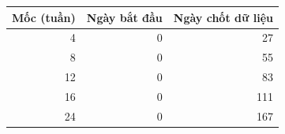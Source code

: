 \begin{tabular}{@{}rrr@{}}
\toprule
\textbf{Mốc (tuần)} & \textbf{Ngày bắt đầu} & \textbf{Ngày chốt dữ liệu} \\
\midrule
\num{4} & \num{0} & \num{27} \\
\num{8} & \num{0} & \num{55} \\
\num{12} & \num{0} & \num{83} \\
\num{16} & \num{0} & \num{111} \\
\num{24} & \num{0} & \num{167} \\
\bottomrule
\end{tabular}
